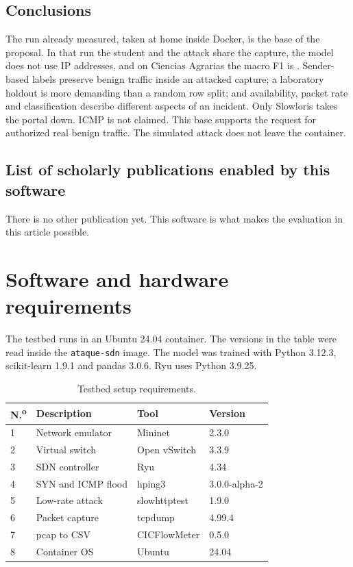 \documentclass[ASNA,twocolumn]{USG}
\begin{document}
\subsection{Conclusions}
The run already measured, taken at home inside Docker, is the base
of the proposal. In that run the student and the attack share the
capture, the model does not use IP addresses, and on Ciencias
Agrarias the macro F1 is \Fmacro. Sender-based labels preserve benign
traffic inside an attacked capture; a laboratory holdout is more
demanding than a random row split; and availability, packet rate and
classification describe different aspects of an incident. Only
Slowloris takes the portal down. ICMP is not claimed. This base
supports the request for authorized real benign traffic. The
simulated attack does not leave the container.

\subsection{List of scholarly publications enabled by this software}
There is no other publication yet. This software is what makes the
evaluation in this article possible.

\section{Software and hardware requirements}\label{sec:requirements}

The testbed runs in an Ubuntu 24.04 container. The versions in the
table were read inside the \texttt{ataque-sdn} image. The model was
trained with Python 3.12.3, scikit-learn 1.9.1 and pandas 3.0.6.
Ryu uses Python 3.9.25.

\begin{table}[t]
\footnotesize
\caption{Testbed setup requirements.}\label{tbl:testbed}
\begin{tabular}{@{}p{0.5cm}p{2.3cm}p{1.7cm}p{1.6cm}@{}}
\toprule
N.\textsuperscript{o} & Description & Tool & Version \\
\midrule
1 & Network emulator & Mininet & 2.3.0 \\
2 & Virtual switch & Open vSwitch & 3.3.9 \\
3 & SDN controller & Ryu & 4.34 \\
4 & SYN and ICMP flood & hping3 & 3.0.0-alpha-2 \\
5 & Low-rate attack & slowhttptest & 1.9.0 \\
6 & Packet capture & tcpdump & 4.99.4 \\
7 & pcap to CSV & CICFlowMeter & 0.5.0 \\
8 & Container OS & Ubuntu & 24.04 \\
\bottomrule
\end{tabular}
\end{table}
\end{document}
